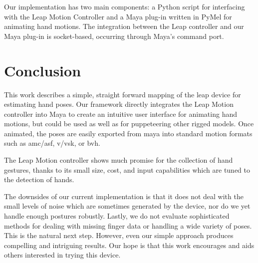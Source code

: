 \documentclass[review]{acmsiggraph}
\begin{document}
Our implementation has two main components: a Python script for interfacing with the 
Leap Motion Controller and a Maya plug-in written in PyMel for animating hand motions.
The integration between the Leap controller and our Maya plug-in is socket-based, 
occurring through Maya's command port. 


%

\section{Conclusion}

This work describes a simple, straight forward mapping of the leap device for estimating hand poses. 
Our framework directly integrates the Leap Motion controller into Maya to create an intuitive user
 interface for animating hand motions, but could be used as well as for puppeteering other rigged models.
 Once animated, the poses are easily exported from maya into standard motion formats such 
as amc/asf, v/vsk, or bvh.

The Leap Motion controller shows much promise for the collection of hand gestures, thanks to its 
small size, cost, and input capabilities which are tuned to the detection of hands. 

The downsides of our current implementation is that it does not deal with the small levels of 
noise which are sometimes generated by the device, nor do we yet handle enough postures robustly.
Lastly, we do not evaluate sophisticated methods for dealing with missing finger data or handling 
a wide variety of poses. This is the natural next step. However, even our simple approach produces  
compelling and intriguing results. Our hope is that this work encourages and aids others interested in trying 
this device.




\end{document}
